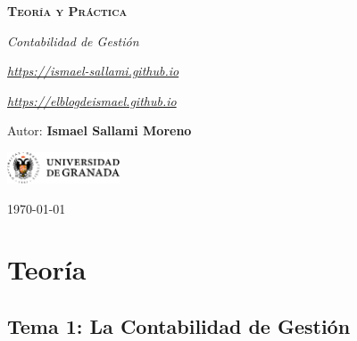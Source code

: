\documentclass[12pt]{report} %
\begin{document}
\begin{titlepage}
    \begin{center}
        \vspace*{2cm}
        
        {\Huge \bfseries\scshape Teoría y Práctica \par}
        \vspace{0.5cm}
        {\Large \itshape Contabilidad de Gestión \par}
        \vspace{0.5cm}
        {\small \itshape \href{https://ismael-sallami.github.io}{https://ismael-sallami.github.io} \par}
        {\small \itshape \href{https://elblogdeismael.github.io}{https://elblogdeismael.github.io} \par}


        \vfill
        
        {\LARGE Autor: \textbf{Ismael Sallami Moreno} \par}
        \vspace{0.3cm}
        
        \vspace{1cm}
        \includegraphics[width=0.25\textwidth]{../../../extraFiles/img/ugr.png} %
        \vspace{1cm}
        
        {\large \today}
    \end{center}
    
    \restoregeometry
\end{titlepage}


\thispagestyle{empty} %
\clearpage

\tableofcontents
\thispagestyle{empty} %
\clearpage

\part{Teoría}

\hypertarget{tema-1-la-contabilidad-de-gestiuxf3n}{%
\chapter{Tema 1: La Contabilidad de
Gestión}\label{tema-1-la-contabilidad-de-gestiuxf3n}}
\end{document}
